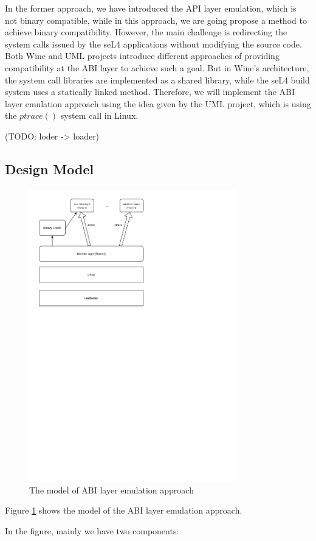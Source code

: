
In the former approach, we have introduced the API layer emulation, which is not binary compatible, while in this approach, we are going propose a method to achieve binary compatibility. However, the main challenge is redirecting the system calls issued by the seL4 applications without modifying the source code. Both Wine and UML projects introduce different approaches of providing compatibility at the ABI layer to achieve such a goal. But in Wine's architecture, the system call libraries are implemented as a shared library, while the seL4 build system uses a statically linked method. Therefore, we will implement the ABI layer emulation approach using the idea given by the UML project, which is using the $ptrace()$ system call in Linux.

(TODO: loder -> loader)
\subsection{Design Model} 

\begin{figure}[h]
    \centering
    \includegraphics[clip, trim=0.5cm 16cm 8cm 0.5cm, width=0.8\textwidth, height=0.8\textwidth]{ch3/model2-v2.pdf}
    \caption{The model of ABI layer emulation approach}
    \label{fig:mabi}
\end{figure}

Figure \ref{fig:mabi} shows the model of the ABI layer emulation approach.

In the figure, mainly we have two components:

